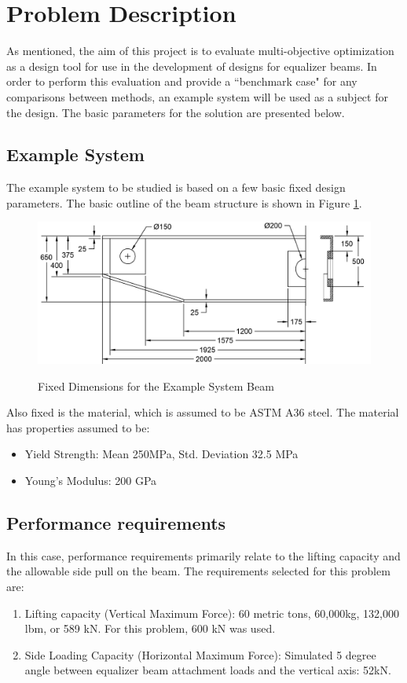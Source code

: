 \section{Problem Description}
As mentioned, the aim of this project is to evaluate multi-objective optimization as a design tool for use in the development of designs for equalizer beams. In order to perform this evaluation and provide a ``benchmark case" for any comparisons between methods, an example system will be used as a subject for the design. The basic parameters for the solution are presented below. 

\subsection{Example System}
\label{sec:beam_des}
The example system to be studied is based on a few basic fixed design parameters. The basic outline of the beam structure is shown in Figure \ref{img:dim_beam}. 

\begin{figure}
\includegraphics[width=\textwidth]{img/dim_beam.png}
	\label{img:dim_beam}
	\caption{Fixed Dimensions for the Example System Beam}
\end{figure}

Also fixed is the material, which is assumed to be ASTM A36 steel. The material has properties assumed to be: 

\begin{itemize}
\item Yield Strength: Mean 250MPa, Std. Deviation 32.5 MPa
\item Young's Modulus: 200 GPa
\end{itemize}

\subsection{Performance requirements}
\label{sec:perf_req}
In this case, performance requirements primarily relate to the lifting capacity and the allowable side pull on the beam. The requirements selected for this problem are: 
\begin{enumerate}
	\item Lifting capacity (Vertical Maximum Force): 60 metric tons, 60,000kg, 132,000 lbm, or 589 kN. For this problem, 600 kN was used. 
	\item Side Loading Capacity (Horizontal Maximum Force):  Simulated 5 degree angle between equalizer beam attachment loads and the vertical axis: 52kN. 
\end{enumerate}

